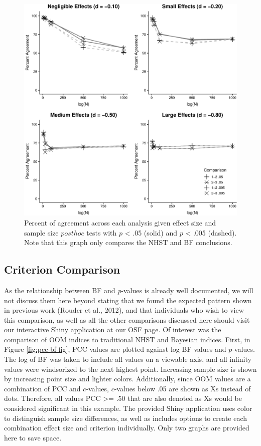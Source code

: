 \documentclass[,man, mask]{apa6}
\theoremstyle{definition}
\theoremstyle{definition}
\theoremstyle{definition}
\theoremstyle{remark}
\begin{document}
\begin{figure}
\centering
\includegraphics{alt_nhst_FINAL_files/figure-latex/agree-graph-post-1.pdf}
\caption{\label{fig:agree-graph-post}Percent of agreement across each
analysis given effect size and sample size \(post hoc\) tests with \(p\)
\textless{} .05 (solid) and \(p\) \textless{} .005 (dashed). Note that
this graph only compares the NHST and BF conclusions.}
\end{figure}

\subsection{Criterion Comparison}\label{criterion-comparison}

As the relationship between BF and \emph{p}-values is already well
documented, we will not discuss them here beyond stating that we found
the expected pattern shown in previous work (Rouder et al., 2012), and
that individuals who wish to view this comparison, as well as all the
other comparisons discussed here should visit our interactive Shiny
application at our OSF page. Of interest was the comparison of OOM
indices to traditional NHST and Bayesian indices. First, in Figure
\ref{fig:pcc-bf-fig}, PCC values are plotted against log BF values and
\(p\)-values. The log of BF was taken to include all values on a
viewable axis, and all infinity values were windsorized to the next
highest point. Increasing sample size is shown by increasing point size
and lighter colors. Additionally, since OOM values are a combination of
PCC and \(c\)-values, \(c\)-values below .05 are shown as Xs instead of
dots. Therefore, all values PCC \textgreater{}= .50 that are also
denoted as Xs would be considered significant in this example. The
provided Shiny application uses color to distinguish sample size
differences, as well as includes options to create each combination
effect size and criterion individually. Only two graphs are provided
here to save space.
\end{document}
